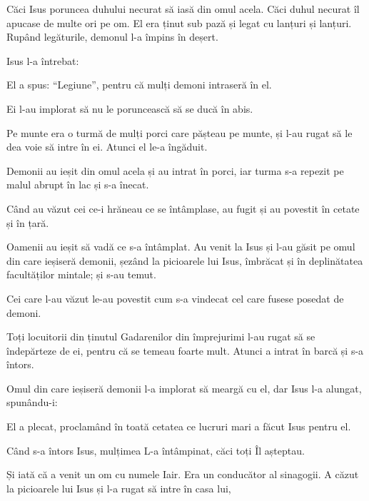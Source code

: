 {Căci Isus poruncea duhului necurat să iasă din omul acela. Căci duhul necurat îl apucase de multe ori pe om. El era ținut sub pază și legat cu lanțuri și lanțuri. Rupând legăturile, demonul l-a împins în deșert.


\par }{\PP {}Isus l-a întrebat:
{}

\par }{\PP El a spus: “Legiune”, pentru că mulți demoni intraseră în el.

Ei l-au implorat să nu le poruncească să se ducă în abis.


\par }{\PP {}Pe munte era o turmă de mulți porci care pășteau pe munte, și l-au rugat să le dea voie să intre în ei. Atunci el le-a îngăduit.

Demonii au ieșit din omul acela și au intrat în porci, iar turma s-a repezit pe malul abrupt în lac și s-a înecat.


\par }{\PP {}Când au văzut cei ce-i hrăneau ce se întâmplase, au fugit și au povestit în cetate și în țară.


\par }{\PP {}Oamenii au ieșit să vadă ce s-a întâmplat. Au venit la Isus și l-au găsit pe omul din care ieșiseră demonii, șezând la picioarele lui Isus, îmbrăcat și în deplinătatea facultăților mintale; și s-au temut.

Cei care l-au văzut le-au povestit cum s-a vindecat cel care fusese posedat de demoni.

Toți locuitorii din ținutul Gadarenilor din împrejurimi l-au rugat să se îndepărteze de ei, pentru că se temeau foarte mult. Atunci a intrat în barcă și s-a întors.

Omul din care ieșiseră demonii l-a implorat să meargă cu el, dar Isus l-a alungat, spunându-i:

 El a plecat, proclamând în toată cetatea ce lucruri mari a făcut Isus pentru el.


\par }{\PP {}Când s-a întors Isus, mulțimea L-a întâmpinat, căci toți Îl așteptau.

Și iată că a venit un om cu numele Iair. Era un conducător al sinagogii. A căzut la picioarele lui Isus și l-a rugat să intre în casa lui,

}
